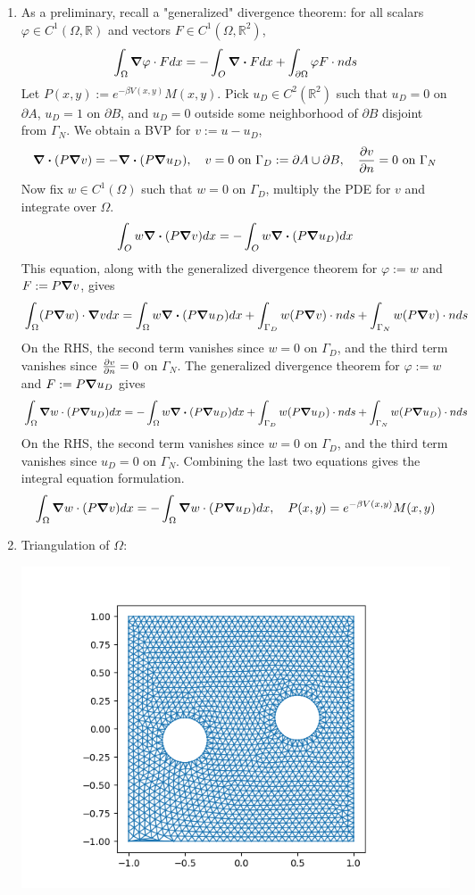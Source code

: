 \documentclass{article}
\def\mbb#1{\mathbb{#1}}
\def\bR{\mbb{R}}
\newcommand{\vp}{\varphi}
\renewcommand{\d}{\partial}
\renewcommand{\O}{\Omega}
\newcommand{\G}{\Gamma}
\begin{document}
\begin{enumerate}
\begin{enumerate}
	
	\item As a preliminary, recall a "generalized" divergence theorem: for all scalars $\vp\in C^1(\O,\bR)$ and vectors $F\in C^1(\O,\bR^2)$,
	\[\int_\O\grad\vp\cdot Fdx = -\int_O\div Fdx + \int_{\d\O}\vp F\cdot nds\]
	Let $P(x,y):=e^{-\beta V(x,y)}M(x,y)$. Pick $u_D\in C^2(\bR^2)$ such that $u_D=0$ on $\d A$, $u_D=1$ on $\d B$, and $u_D=0$ outside some neighborhood of $\d B$ disjoint from $\G_N$. We obtain a BVP for $v:=u-u_D$,
	\[\div(P\grad v) = -\div(P\grad u_D),
	\quad v=0 \text{ on } \G_D:=\d A\cup\d B,
	\quad \pdv{v}{n}=0 \text{ on } \G_N\]
	Now fix $w\in C^1(\O)$ such that $w=0$ on $\G_D$, multiply the PDE for $v$ and integrate over $\O$.
	\[\int_O w\div(P\grad v)dx = -\int_O w\div(P\grad u_D)dx\]
	This equation, along with the generalized divergence theorem for $\vp:=w$ and $F:=P\grad v$, gives
	\[\int_\O (P\grad w)\cdot\grad vdx = \int_\O w\div(P\grad u_D)dx + \int_{\G_D} w(P\grad v)\cdot nds + \int_{\G_N} w(P\grad v)\cdot nds\]
	On the RHS, the second term vanishes since $w=0$ on $\G_D$, and the third term vanishes since $\pdv{v}{n}=0$ on $\G_N$. The generalized divergence theorem for $\vp:=w$ and $F:=P\grad u_D$ gives
	\[\int_\O \grad w\cdot(P\grad u_D)dx = -\int_\O w\div(P\grad u_D)dx + \int_{\G_D} w(P\grad u_D)\cdot nds + \int_{\G_N} w(P\grad u_D)\cdot nds\]
	On the RHS, the second term vanishes since $w=0$ on $\G_D$, and the third term vanishes since $u_D=0$ on $\G_N$. Combining the last two equations gives the integral equation formulation.
	\[\int_\O \grad w\cdot(P\grad v)dx = -\int_\O \grad w\cdot(P\grad u_D)dx,
	\quad P(x,y) = e^{-\beta V(x,y)}M(x,y)\]
	
	
	\item Triangulation of $\O$:
	\begin{center}
		\includegraphics[scale=.5]{final 2 mesh}
	\end{center}



\end{enumerate}
\end{enumerate}
\end{document}
